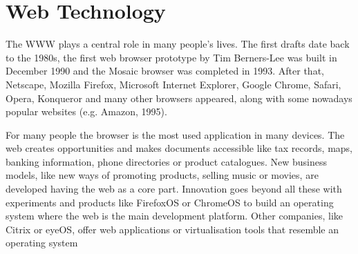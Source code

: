 





\section{Web Technology}
The \ac{WWW} plays a central role in many people's lives.
The first drafts date back to the 1980s, the first web browser prototype by Tim Berners-Lee was built in December 1990 and the Mosaic browser was completed in 1993.
After that, Netscape, Mozilla Firefox, Microsoft Internet Explorer, Google Chrome, Safari, Opera, Konqueror and many other browsers appeared, along with some nowadays popular websites (e.g. Amazon, 1995).

For many people the browser is the most used application in many devices. 
The web creates opportunities and makes documents accessible like tax records, maps, banking information, phone directories or product catalogues.
New business models, like new ways of promoting products, selling music or movies, are developed having the web as a core part.
Innovation goes beyond all these with experiments and products like FirefoxOS or ChromeOS to build an operating system where the web is the main development platform.
Other companies, like Citrix or eyeOS, offer web applications or virtualisation tools that resemble an operating system %

